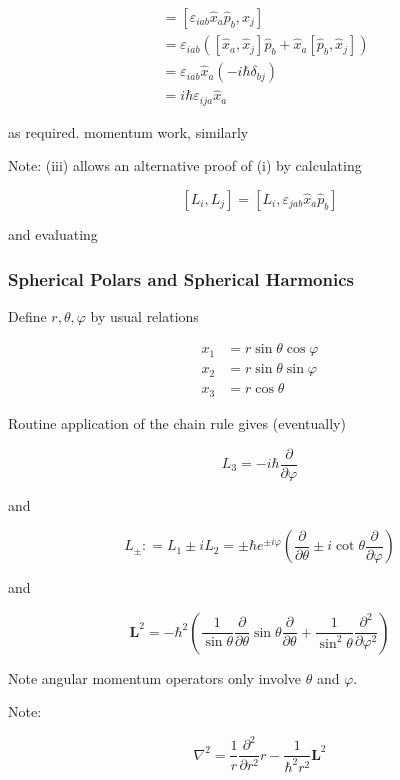\documentclass[a4paper]{article}
\begin{document}
\begin{enumerate}
\begin{align*}
[L_{i}, \hat{x}_{j} ] & =  [  \varepsilon_{iab} \hat{x}_{a} \hat{p}_{b} , \hat{x}_{j}  ] \\
& = \varepsilon_{iab} \left(  [  \hat{x}_{a},\hat{x}_{j} ]  \hat{p}_{b} + \hat{x}_{a}  [  \hat{p}_{b},\hat{x}_{j} ]   \right) \\
& = \varepsilon_{iab}\hat{x}_{a} ( - i \hbar \delta_{bj} )  \\
& = i \hbar \varepsilon_{ija} \hat{x}_{a}  
\end{align*}

as required. momentum work, similarly

Note: (iii) allows an alternative proof of (i) by calculating 

\[ [L_{i},L_{j}] = [L_{i}, \varepsilon_{jab} \hat{x}_{a}\hat{p}_{b}  ]  \]

and evaluating

\subsubsection{Spherical Polars and Spherical Harmonics}

Define $ r,\theta,\varphi $ by usual relations

\begin{align*}
x_{1} & = r \sin \theta \cos \varphi \\
x_{2} & = r \sin \theta \sin \varphi \\
x_{3} & = r \cos \theta 
\end{align*}


Routine application of the chain rule gives (eventually)

\[ L_{3} = - i \hbar \frac{\partial }{\partial \varphi} \]

and 

\[ L_{\pm} : = L_{1} \pm i L_{2} = \pm \hbar e^{\pm i \varphi}  \left(  \frac{\partial }{\partial \theta} \pm  i \cot  \theta\frac{\partial }{\partial \varphi} \right)  \]

and

\[ \mathbf{L}^{2}  = -\hbar^{2} \left(  \frac{1}{\sin \theta} \frac{\partial }{\partial \theta} \sin \theta  \frac{\partial }{\partial \theta}   + \frac{1}{\sin^{2} \theta}  \frac{\partial^{2} }{\partial \varphi^{2}}  \right)      \]

Note angular momentum operators only involve $ \theta $ and $ \varphi $. 

Note:

\[ \nabla^{2} = \frac{1}{r} \frac{\partial^{2} }{\partial r^{2}} r - \frac{1}{\hbar^{2} r^{2} } \mathbf{L}^{2}  \]


\end{enumerate}
\end{document}
